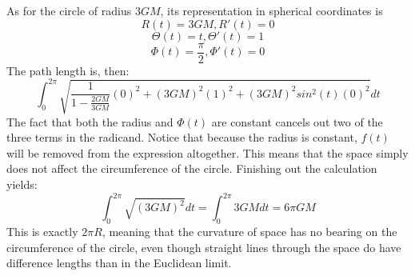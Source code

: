 \documentclass{article}
\begin{document}
As for the circle of radius $3GM$, its representation in spherical coordinates is
\[
R(t) = 3GM, R'(t) = 0
\]
\[
\Theta(t) = t, \Theta'(t) = 1
\]
\[
\Phi(t) = \frac{\pi}{2}, \Phi'(t) = 0
\]
The path length is, then:
\[
\int_0^{2\pi} \sqrt{\frac{1}{1-\frac{2GM}{3GM}}(0)^2 + (3GM)^2 (1)^2 + (3GM)^2 sin^2(t)(0)^2} dt
\]
The fact that both the radius and $\Phi(t)$ are constant cancels out two of the three terms in the radicand. Notice that because the radius is constant, $f(t)$ will be removed from the expression altogether. This means that the space simply does not affect the circumference of the circle. Finishing out the calculation yields:
\[
\int_0^{2\pi} \sqrt{(3GM)^2} dt = \int_0^{2\pi} 3GM dt = 6\pi GM
\]
This is exactly $2\pi R$, meaning that the curvature of space has no bearing on the circumference of the circle, even though straight lines through the space do have difference lengths than in the Euclidean limit.
\end{document}
